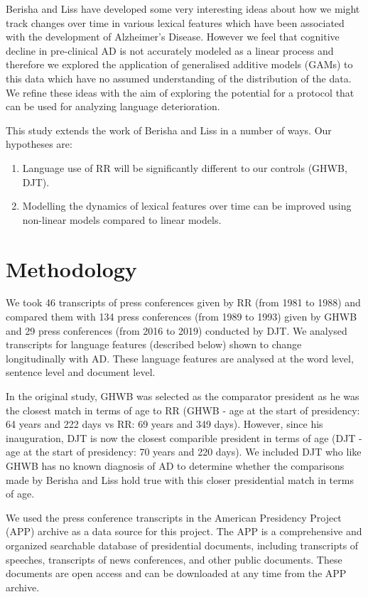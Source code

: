 \documentclass[12pt]{article}
\begin{document}
\par   
Berisha and Liss have developed some very interesting ideas about how we might track changes over time in various lexical features which have been associated with the development of Alzheimer's Disease. However we feel that cognitive decline in pre-clinical AD is not accurately modeled as a linear process and therefore we explored the application of generalised additive models (GAMs) to this data which have no assumed understanding of the distribution of the data. We refine these ideas with the aim of exploring the potential for a protocol that can be used for analyzing language deterioration. 


This study extends the work of Berisha and Liss in a number of ways. Our hypotheses are:
\begin{enumerate}
	\item Language use of RR will be significantly different to our controls (GHWB, DJT).
	\item Modelling the dynamics of lexical features over time can be improved using non-linear models compared to linear models.
\end{enumerate}

\section{Methodology}\label{methodology}
We took 46 transcripts of press conferences given by RR (from 1981 to 1988) and compared them with 134 press conferences (from 1989 to 1993) given by GHWB and 29 press conferences (from 2016 to 2019) conducted by DJT.  We analysed transcripts for language features (described below) shown to change longitudinally with AD. These language features are analysed at the word level, sentence level and document level. 
\par 
In the original study, GHWB was selected as the comparator president as he was the closest match in terms of age to RR (GHWB - age at the start of presidency: 64 years and 222 days vs RR: 69 years and 349 days). However, since his inauguration, DJT is now the closest comparible president in terms of age (DJT - age at the start of presidency: 70 years and 220 days). We included DJT who like GHWB has no known diagnosis of AD to determine whether the comparisons made by Berisha and Liss hold true with this closer presidential match in terms of age. 
\par 
We used the press conference transcripts in the American Presidency Project (APP) archive as a data source for this project. The APP is a comprehensive and organized searchable database of presidential documents, including transcripts of speeches, transcripts of news conferences, and other public documents. These documents are open access and can be downloaded at any time from the APP archive.
\end{document}
